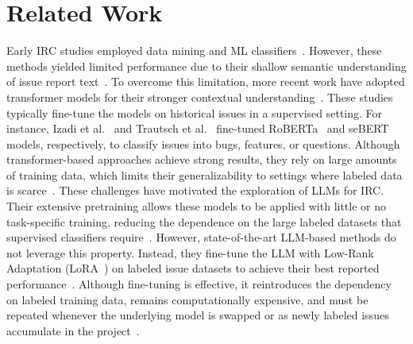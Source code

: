 
\section{Related Work}
\label{sec:02_related}

 Early IRC studies employed data mining and ML classifiers~\cite{antoniol2008bug, kallis2019ticket, fan2017road}. 
However, these methods yielded limited performance due to their shallow semantic understanding of issue report text~\cite{heo2025study}. To overcome this limitation, more recent work have adopted transformer models for their stronger contextual understanding~\cite{colavito2022issue, bharadwaj2022github, trautsch2022predicting, izadi2022catiss, izadi2022predicting}. These studies typically fine-tune the models on historical issues in a supervised setting. 
For instance, Izadi et al.~\cite{izadi2022catiss} and Trautsch et al.~\cite{trautsch2022predicting} fine-tuned RoBERTa~\cite{liu2019roberta} and seBERT~\cite{von2022validity} models, respectively, to classify issues into bugs, features, or questions.
Although transformer-based approaches achieve strong results, they rely on large amounts of training data, which limits their generalizability to settings where labeled data is scarce~\cite{heo2025study, izadi2022catiss, izadi2022predicting, colavito2022issue}. These challenges have motivated the exploration of LLMs for IRC. Their extensive pretraining allows these models to be applied with little or no task-specific training, reducing the dependence on the large labeled datasets that supervised classifiers require~\cite{aracena2025applying, aracena2024applyinglargelanguagemodels, colavito2024leveraging, colavito2025benchmarking, colavito2024large}. However, state-of-the-art LLM-based methods do not leverage this property. Instead, they fine-tune the LLM with Low-Rank Adaptation (LoRA~\cite{hu2022lora}) on labeled issue datasets to achieve their best reported performance~\cite{heo2025study, aracena2025applying, aracena2024applyinglargelanguagemodels}. Although fine-tuning is effective, it reintroduces the dependency on labeled training data, remains computationally expensive, and must be repeated whenever the underlying model is swapped or as newly labeled issues accumulate in the project~\cite{fan2017road, kallis2019ticket}.


